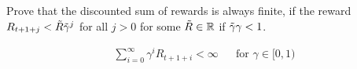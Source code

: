 Prove that the discounted sum of rewards is always finite, 
if the reward $R_{t+1+j} < \Tilde{R}\Tilde{\gamma}^j$ for all 
$j > 0$ for some $\Tilde{R} \in \mathbb{R}$ if $\Tilde{\gamma}\gamma < 1 $.

\begin{align*}
\sum_{i=0}^\infty \gamma^i R_{t+1+i} < \infty && \text{for } \gamma \in [0,1)
\end{align*}

\smallspace
